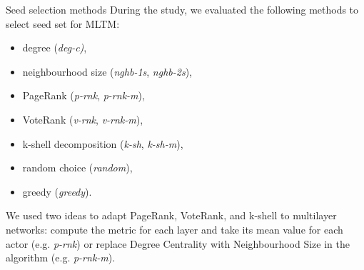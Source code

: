 \documentclass[final]{beamer}
\newlength{\colwidth}
\begin{document}
\begin{frame}[t, fragile]
\begin{columns}[t]
\begin{column}{\colwidth}
\begin{block}{Seed selection methods}
    During the study, we evaluated the following methods to select seed set for MLTM:
    \begin{itemize}
        \item degree (\textit{deg-c)},
        \item neighbourhood size (\textit{nghb-1s}, \textit{nghb-2s}),
        \item PageRank (\textit{p-rnk}, \textit{p-rnk-m}),
        \item VoteRank (\textit{v-rnk}, \textit{v-rnk-m}),
        \item k-shell decomposition (\textit{k-sh}, \textit{k-sh-m}),
        \item random choice (\textit{random}),
        \item greedy (\textit{greedy}).
    \end{itemize}
    We used two ideas to adapt PageRank, VoteRank, and k-shell to multilayer networks: compute the metric for each layer and take its mean value for each actor (e.g. \textit{p-rnk}) or replace Degree Centrality with Neighbourhood Size in the algorithm (e.g. \textit{p-rnk-m}).
\end{block}




\end{column}
\end{columns}
\end{frame}
\end{document}
